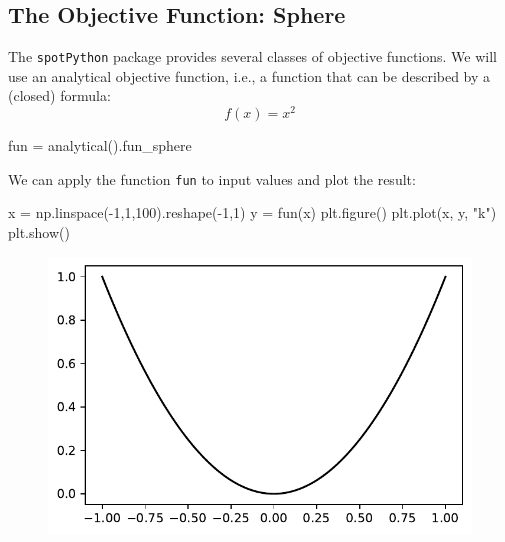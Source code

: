 \documentclass[
  letterpaper,
  DIV=11,
  numbers=noendperiod]{scrreprt}
\newenvironment{Shaded}{\begin{snugshade}}{\end{snugshade}}
\newcommand{\DecValTok}[1]{\textcolor[rgb]{0.68,0.00,0.00}{#1}}
\newcommand{\NormalTok}[1]{\textcolor[rgb]{0.00,0.23,0.31}{#1}}
\newcommand{\OperatorTok}[1]{\textcolor[rgb]{0.37,0.37,0.37}{#1}}
\newcommand{\StringTok}[1]{\textcolor[rgb]{0.13,0.47,0.30}{#1}}
\begin{document}
\hypertarget{the-objective-function-sphere}{%
\subsection{The Objective Function:
Sphere}\label{the-objective-function-sphere}}

The \texttt{spotPython} package provides several classes of objective
functions. We will use an analytical objective function, i.e., a
function that can be described by a (closed) formula: \[f(x) = x^2\]

\begin{Shaded}
\begin{Highlighting}[]
\NormalTok{fun }\OperatorTok{=}\NormalTok{ analytical().fun\_sphere}
\end{Highlighting}
\end{Shaded}

We can apply the function \texttt{fun} to input values and plot the
result:

\begin{Shaded}
\begin{Highlighting}[]
\NormalTok{x }\OperatorTok{=}\NormalTok{ np.linspace(}\OperatorTok{{-}}\DecValTok{1}\NormalTok{,}\DecValTok{1}\NormalTok{,}\DecValTok{100}\NormalTok{).reshape(}\OperatorTok{{-}}\DecValTok{1}\NormalTok{,}\DecValTok{1}\NormalTok{)}
\NormalTok{y }\OperatorTok{=}\NormalTok{ fun(x)}
\NormalTok{plt.figure()}
\NormalTok{plt.plot(x, y, }\StringTok{"k"}\NormalTok{)}
\NormalTok{plt.show()}
\end{Highlighting}
\end{Shaded}

\begin{figure}[H]

{\centering \includegraphics{01_spot_intro_files/figure-pdf/cell-4-output-1.pdf}

}

\end{figure}
\end{document}
